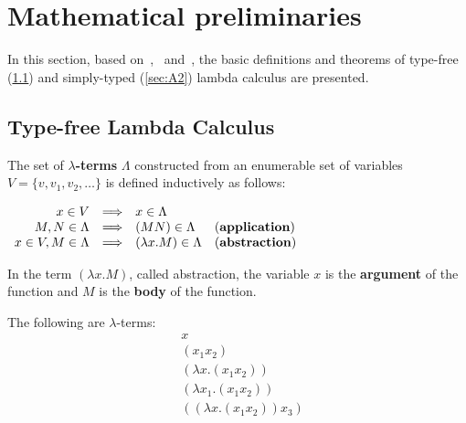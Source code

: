\section{Mathematical preliminaries} \label{tex:math_prelim}

\cite{Church:1940:A-formulation-of-the-simple-theory-of-types}


In this section, based on~\cite{Barendregt:1981:The-Lambda-Calculus:-Its-Syntax-and-Semantics},~\cite{Barendregt:1992:Lambda-Calculi-with-Types} and~\cite{HindleySeldin:2008:Lambda-Calculus-and-Combinators-an-Introduction}, the basic definitions and theorems of type-free (\ref{sec:A1}) and simply-typed (\ref{sec:A2}) lambda calculus are presented. 

\subsection{Type-free Lambda Calculus} \label{sec:A1}

\begin{definition} The set of \textbf{$\lambda$-terms} $\Lambda$ constructed from an enumerable set of variables $V = \{ v, v_1 ,v_2, \dots\}$ is defined inductively as follows:
\begin{center}
$
\begin{array}{rcll}
x \in V & \Longrightarrow & x \in \Lambda &\\
M,N \in \Lambda &  \Longrightarrow & (MN) \in \Lambda & \text{(\textbf{application})}\\ 
 x \in V, M \in \Lambda&  \Longrightarrow  & (\lambda x.M) \in \Lambda & \text{(\textbf{abstraction})}
\end{array} 
$
\end{center}
\end{definition}

In the term $ (\lambda x.M)$, called abstraction, the variable $x$ is the \textbf{argument} of the function and $M$ is the \textbf{body} of the function. %

\begin{example} \label{app:ex1} The following are $\lambda$-terms:
\begin{align*}
& x \\
& (x_1x_2) \\
& (\lambda x. (x_1 x_2)) \\
& (\lambda x_1. (x_1 x_2)) \\
& ((\lambda x. (x_1 x_2)) x_3 ) 
\end{align*}
\end{example}


